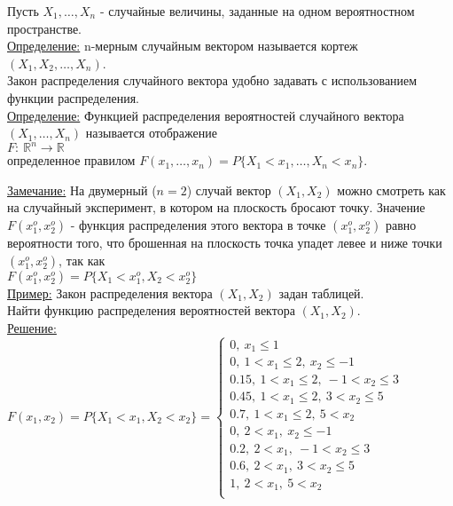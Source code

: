 
Пусть $X_1, \ldots, X_n$ - случайные величины, заданные на одном вероятностном пространстве. \\

\underline{Определение:} n-мерным случайным вектором называется кортеж $(X_1, X_2, \ldots, X_n)$. \\

Закон распределения случайного вектора удобно задавать с использованием функции распределения. \\

\underline{Определение:} Функцией распределения вероятностей случайного вектора $(X_1, \ldots, X_n)$ называется отображение \\
$F: \ \mathbb{R}^n \to \mathbb{R}$ \\
определенное правилом $F(x_1, \ldots, x_n) = P\{X_1 < x_1, \ldots, X_n < x_n\}$.

\underline{Замечание:} На двумерный ($n = 2$) случай вектор $(X_1, X_2)$ можно смотреть как на случайный эксперимент, в котором на плоскость бросают точку. Значение $F(x_1^o, x_2^o)$ - функция распределения этого вектора в точке $(x_1^o, x_2^o)$ равно вероятности того, что брошенная на плоскость точка упадет левее и ниже точки $(x_1^o, x_2^o)$, так как \\
$F(x_1^o, x_2^o) = P\{X_1 < x_1^o, X_2 < x_2^o\}$ \\


\underline{Пример:} Закон распределения вектора $(X_1, X_2)$ задан таблицей. \\
Найти функцию распределения вероятностей вектора $(X_1, X_2)$. \\
\underline{Решение:} \\
$F(x_1, x_2) = P\{X_1 < x_1, X_2 < x_2\} = 
\begin{cases}
	0, \ x_1 \leqslant 1 \\
	0, \ 1 < x_1 \leqslant 2, \ x_2 \leqslant -1 \\
	0.15, \ 1 < x_1 \leqslant 2, \ -1 < x_2 \leqslant 3 \\
	0.45, \ 1 < x_1 \leqslant 2, \ 3 < x_2 \leqslant 5 \\
	0.7, \ 1 < x_1 \leqslant 2, \ 5 < x_2 \\
	0, \ 2 < x_1, \ x_2 \leqslant -1 \\
	0.2, \ 2 < x_1, \ -1 < x_2 \leqslant 3 \\
	0.6, \ 2 < x_1, \ 3 < x_2 \leqslant 5 \\
	1, \ 2 < x_1, \ 5 < x_2 \\
\end{cases}$